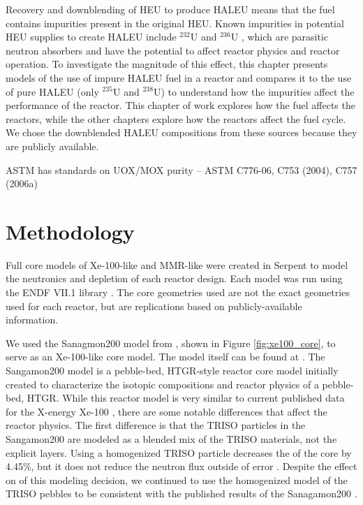 Recovery and downblending of \gls{HEU} to produce \gls{HALEU} means that 
the fuel contains impurities present in the original
\gls{HEU}. Known impurities in potential \gls{HEU}
supplies to create \gls{HALEU} include $^{232}$U and $^{236}$U
\cite{vaden_isotopic_2018,nelson_foreign_2010},  
which are parasitic neutron absorbers and have the potential to affect 
reactor physics and reactor operation. To investigate the magnitude of this 
effect, this chapter presents models of the use of 
impure \gls{HALEU} fuel in a reactor and compares it to the use of pure 
\gls{HALEU} (only $^{235}$U and $^{238}$U)
to understand how the impurities affect the performance of the reactor.
This chapter of work explores how the fuel affects the reactors, while 
the other chapters explore how the reactors affect the fuel cycle. We chose 
the downblended \gls{HALEU} compositions from these sources because
they are publicly available. 




ASTM has standards on UOX/MOX purity -- ASTM C776-06, C753 (2004), C757 (2006a)

\section{Methodology}
Full core models of Xe-100-like and \gls{MMR}-like were created in Serpent 
\cite{leppanen_serpent_2014} to model the neutronics and depletion of 
each reactor design. Each model was run using the ENDF VII.1 library
\cite{chadwick_endfb-vii1_2011}. The core geometries used are not 
the exact geometries used for each reactor, but are replications based 
on publicly-available information. 

We used the Sanagmon200 model from \cite{richter_isotopic_2022}, shown in 
Figure \ref{fig:xe100_core}, to serve as an Xe-100-like 
core model. The model itself can be found at \cite{richter_zoerichterphlox_2022}.
The Sangamon200 model is a pebble-bed, \gls{HTGR}-style reactor core model 
initially created to characterize the isotopic compositions and 
reactor physics of a pebble-bed, \gls{HTGR}. While this reactor model 
is very similar to current published data for the X-energy Xe-100
\cite{mulder_overview_2021}, there are some notable differences that affect 
the reactor physics. The first difference is that the \gls{TRISO} particles 
in the Sangamon200 are modeled as a blended mix of the \gls{TRISO} 
materials, not the explicit layers. Using a homogenized \gls{TRISO} particle 
decreases the \keff of the core by 4.45\%, but it does not reduce the 
neutron flux outside of error \cite{richter_isotopic_2022}. Despite 
the effect on \keff of this modeling decision, we continued to use the 
homogenized model of the \gls{TRISO} pebbles to be consistent with the 
published results of the Sanagamon200 \cite{richter_isotopic_2022}. 

